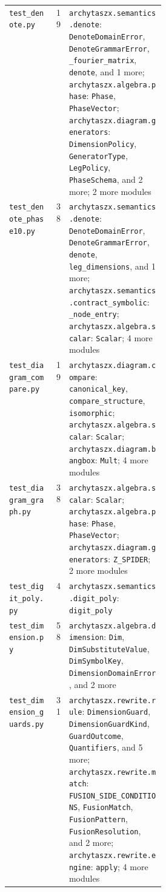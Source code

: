 \begin{xltabular}{\linewidth}{@{}>{\raggedright\arraybackslash}p{0.3\linewidth}r>{\raggedright\arraybackslash}X@{}}
\texttt{test\_\allowbreak{}denote.py} & 19 & \texttt{archytaszx.\allowbreak{}semantics.\allowbreak{}denote}: \texttt{DenoteDomainError}, \texttt{DenoteGrammarError}, \texttt{\_\allowbreak{}fourier\_\allowbreak{}matrix}, \texttt{denote}, and 1 more; \texttt{archytaszx.\allowbreak{}algebra.\allowbreak{}phase}: \texttt{Phase}, \texttt{PhaseVector}; \texttt{archytaszx.\allowbreak{}diagram.\allowbreak{}generators}: \texttt{DimensionPolicy}, \texttt{GeneratorType}, \texttt{LegPolicy}, \texttt{PhaseSchema}, and 2 more; 2 more modules \\
\texttt{test\_\allowbreak{}denote\_\allowbreak{}phase10.py} & 38 & \texttt{archytaszx.\allowbreak{}semantics.\allowbreak{}denote}: \texttt{DenoteDomainError}, \texttt{DenoteGrammarError}, \texttt{denote}, \texttt{leg\_\allowbreak{}dimensions}, and 1 more; \texttt{archytaszx.\allowbreak{}semantics.\allowbreak{}contract\_\allowbreak{}symbolic}: \texttt{\_\allowbreak{}node\_\allowbreak{}entry}; \texttt{archytaszx.\allowbreak{}algebra.\allowbreak{}scalar}: \texttt{Scalar}; 4 more modules \\
\texttt{test\_\allowbreak{}diagram\_\allowbreak{}compare.py} & 19 & \texttt{archytaszx.\allowbreak{}diagram.\allowbreak{}compare}: \texttt{canonical\_\allowbreak{}key}, \texttt{compare\_\allowbreak{}structure}, \texttt{isomorphic}; \texttt{archytaszx.\allowbreak{}algebra.\allowbreak{}scalar}: \texttt{Scalar}; \texttt{archytaszx.\allowbreak{}diagram.\allowbreak{}bangbox}: \texttt{Mult}; 4 more modules \\
\texttt{test\_\allowbreak{}diagram\_\allowbreak{}graph.py} & 38 & \texttt{archytaszx.\allowbreak{}algebra.\allowbreak{}scalar}: \texttt{Scalar}; \texttt{archytaszx.\allowbreak{}algebra.\allowbreak{}phase}: \texttt{Phase}, \texttt{PhaseVector}; \texttt{archytaszx.\allowbreak{}diagram.\allowbreak{}generators}: \texttt{Z\_\allowbreak{}SPIDER}; 2 more modules \\
\texttt{test\_\allowbreak{}digit\_\allowbreak{}poly.py} & 4 & \texttt{archytaszx.\allowbreak{}semantics.\allowbreak{}digit\_\allowbreak{}poly}: \texttt{digit\_\allowbreak{}poly} \\
\texttt{test\_\allowbreak{}dimension.py} & 58 & \texttt{archytaszx.\allowbreak{}algebra.\allowbreak{}dimension}: \texttt{Dim}, \texttt{DimSubstituteValue}, \texttt{DimSymbolKey}, \texttt{DimensionDomainError}, and 2 more \\
\texttt{test\_\allowbreak{}dimension\_\allowbreak{}guards.py} & 31 & \texttt{archytaszx.\allowbreak{}rewrite.\allowbreak{}rule}: \texttt{DimensionGuard}, \texttt{DimensionGuardKind}, \texttt{GuardOutcome}, \texttt{Quantifiers}, and 5 more; \texttt{archytaszx.\allowbreak{}rewrite.\allowbreak{}match}: \texttt{FUSION\_\allowbreak{}SIDE\_\allowbreak{}CONDITIONS}, \texttt{FusionMatch}, \texttt{FusionPattern}, \texttt{FusionResolution}, and 2 more; \texttt{archytaszx.\allowbreak{}rewrite.\allowbreak{}engine}: \texttt{apply}; 4 more modules \\

\end{xltabular}
